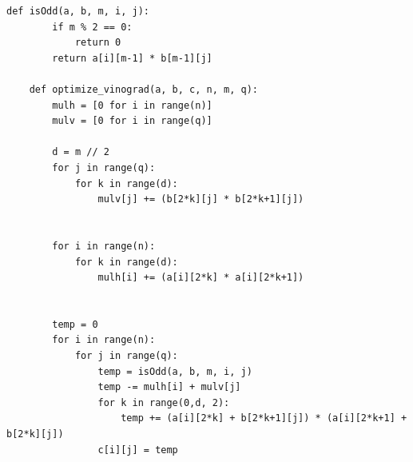 \documentclass[a4paper]{article}
\begin{document}
\begin{lstlisting}[label = optimize_vinograd, caption = Оптимизированный алгоритм Винограда умножения матриц]
	def isOdd(a, b, m, i, j):
		if m % 2 == 0:
			return 0
		return a[i][m-1] * b[m-1][j]
		
	def optimize_vinograd(a, b, c, n, m, q):
		mulh = [0 for i in range(n)]
		mulv = [0 for i in range(q)]
		
		d = m // 2     
		for j in range(q):
			for k in range(d):
				mulv[j] += (b[2*k][j] * b[2*k+1][j])
		
		
		for i in range(n):
			for k in range(d):
				mulh[i] += (a[i][2*k] * a[i][2*k+1])
		
		
		temp = 0
		for i in range(n):
			for j in range(q):
				temp = isOdd(a, b, m, i, j)
				temp -= mulh[i] + mulv[j]
				for k in range(0,d, 2):
					temp += (a[i][2*k] + b[2*k+1][j]) * (a[i][2*k+1] + b[2*k][j])
				c[i][j] = temp
		
\end{lstlisting}
\clearpage
\end{document}
